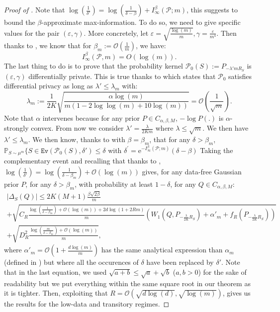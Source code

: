 \begin{proof}[Proof of ]
Note that $\log\left(\frac{1}{\delta'}   \right) = \log\left(\frac{1}{\delta - \beta}   \right) + I_{\infty}^\beta(\mathcal{P} ; m)$, this suggests to bound the $\beta$-approximate max-information. To do so, we need to give specific values for the pair $(\varepsilon,\gamma)$.
More concretely, let $\varepsilon= \sqrt{\frac{\log(m)}{m}}, \gamma= \frac{\varepsilon}{m^4}$.
Then thanks to , we know that for $\beta_m := \mathcal{O}(\frac{1}{m})$, we have:
\begin{equation}
\label{eq: rogers_bound}
I_{\infty}^\beta(\mathcal{P}, m)=O\left(\log(m) \right) .
\end{equation}
The last thing to do is to prove that the probability kernel $\mathcal{P}_0(S):= P_{-\lambda' m R_S}$ is $(\varepsilon,\gamma)$ differentially private. This is true thanks to  which states that $\mathcal{P}_0$ satisfies differential privacy as long as $\lambda' \leq \lambda_{m}$ with:
\begin{equation}
\label{eq: inv_temp}
\lambda_m:= \frac{1}{2K}\sqrt{\frac{\alpha \log(m)}{m\left(1-2\log\log(m) +10\log(m) \right)}} = \mathcal{O}\left(\frac{1}{\sqrt{m}}\right).
\end{equation}
Note that $\alpha$ intervenes because for any prior $P\in C_{\alpha,\beta,M}$, $-\log P(.)$ is $\alpha$-strongly convex.
From now we consider $\lambda'= \frac{\lambda}{2Km}$ where $\lambda \leq \sqrt{m}$. We then have $\lambda' \leq \lambda_m$.
We then know, thanks to  with $\beta=\beta_m$, that for any $\delta > \beta_m$,  $\mathbb{P}_{S \sim \mu^m}\{S \in \texttt{Ev}(\mathcal{P}_0(S),\delta') \leq \delta$
with $\delta^{\prime}=\mathrm{e}^{-I_{\infty}^\beta(\mathcal{P} ; m)}(\delta-\beta)$
Taking the complementary event and recalling that thanks to , $\log\left(\frac{1}{\delta'}   \right) = \log\left(\frac{1}{\delta - \beta_m}   \right) + \mathcal{O}(\log(m))$ gives,
for any data-free Gaussian prior $P$, for any $\delta > \beta_m$, with probability at least $1-\delta$, for any $Q\in C_{\alpha,\beta,M}$:
\begin{multline}
\label{eq: complete_data_dep}
|\Delta_S(Q)| \leq 2K(M+1)\frac{\beta\sqrt{2\beta}}{m} \\
+\sqrt{ C_R \frac{\log(\frac{1}{\delta-\beta_m}) + \mathcal{O}(\log(m)) +2d\log\left(1 +2Rm \right)}{m} \left(W_1( Q, P_{-\frac{\lambda}{2K} R_S})+\alpha'_m + f_R(P_{-\frac{\lambda}{2K} R_S}) \right) }  \\
+\sqrt{ D_R^2\frac{\log\left( \frac{m}{\delta-\beta_m} \right) +\mathcal{O}(\log(m)) }{m}},
\end{multline}
where $\alpha'_m= \mathcal{O}(1+ \frac{d\log(m)}{m})$ has the same analytical expression than $\alpha_m$ (defined in ) but where all the occurences of $\delta$ have been replaced by $\delta'$.
Note that in the last equation, we used $\sqrt{a+b} \leq \sqrt{a} + \sqrt{b}$ ($a,b>0$) for the sake of readability but we put everything within the same square root in our theorem as it is tighter.
Then, exploiting that $R= \mathcal{O}(\sqrt{d\log (d)}, \sqrt{\log(m)})$, gives us the results for the low-data and transitory regimes.
\medskip


\end{proof}
